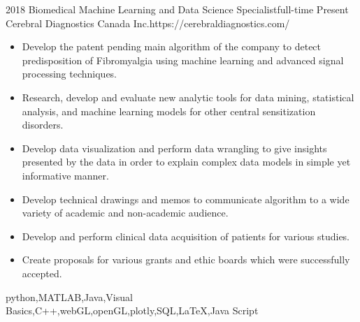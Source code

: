 %
%
%




\begin{experiences}
	
	\myExperience
	{2018}       {Biomedical Machine Learning and Data Science Specialist}{full-time}
	{Present}      {Cerebral Diagnostics Canada Inc.}{https://cerebraldiagnostics.com/}
	{
		\begin{itemize}
			\item Develop the patent pending main algorithm of the company to detect predisposition of Fibromyalgia using machine learning and advanced signal processing techniques.
			\item Research, develop and evaluate new analytic tools for data mining, statistical analysis, and machine learning models for other central sensitization disorders.
			\item Develop data visualization and perform data wrangling to give insights presented by the data in order to explain complex data models in simple yet informative manner.
			\item Develop technical drawings and memos to communicate algorithm to a wide variety of academic and non-academic audience.
			\item Develop and perform clinical data acquisition of patients for various studies.
			\item Create proposals for various grants and ethic boards which were successfully accepted.
		\end{itemize}
	}
	{python,MATLAB,Java,Visual Basics,C++,webGL,openGL,plotly,SQL,\LaTeX,Java Script}
	
	\emptySeparator
	

\end{experiences}
